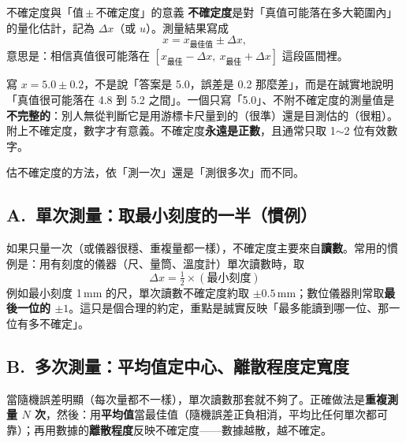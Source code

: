 \documentclass[11pt]{article}
\begin{document}
\begin{補充框}{不確定度與「值\,$\pm$\,不確定度」的意義}
\textbf{不確定度}是對「真值可能落在多大範圍內」的量化估計，記為 $\Delta x$（或 $u$）。測量結果寫成
$$x = x_{\text{最佳值}} \pm \Delta x,$$
意思是：相信真值很可能落在 $[x_{\text{最佳}}-\Delta x,\ x_{\text{最佳}}+\Delta x]$ 這段區間裡。

寫 $x = 5.0 \pm 0.2$，不是說「答案是 5.0，誤差是 0.2 那麼差」，而是在誠實地說明「真值很可能落在 4.8 到 5.2 之間」。一個只寫「5.0」、不附不確定度的測量值是\textbf{不完整的}：別人無從判斷它是用游標卡尺量到的（很準）還是目測估的（很粗）。附上不確定度，數字才有意義。不確定度\textbf{永遠是正數}，且通常只取 1$\sim$2 位有效數字。
\end{補充框}

估不確定度的方法，依「測一次」還是「測很多次」而不同。

\subsection*{\sffamily A.\ 單次測量：取最小刻度的一半（慣例）}

如果只量一次（或儀器很穩、重複量都一樣），不確定度主要來自\textbf{讀數}。常用的慣例是：用有刻度的儀器（尺、量筒、溫度計）單次讀數時，取
$$\boxed{\ \Delta x = \tfrac{1}{2}\times(\text{最小刻度})\ }$$
例如最小刻度 1\,mm 的尺，單次讀數不確定度約取 $\pm 0.5$\,mm；數位儀器則常取\textbf{最後一位的 $\pm 1$}。這只是個合理的約定，重點是誠實反映「最多能讀到哪一位、那一位有多不確定」。

\subsection*{\sffamily B.\ 多次測量：平均值定中心、離散程度定寬度}

當隨機誤差明顯（每次量都不一樣），單次讀數那套就不夠了。正確做法是\textbf{重複測量 $N$ 次}，然後：用\textbf{平均值}當最佳值（隨機誤差正負相消，平均比任何單次都可靠）；再用數據的\textbf{離散程度}反映不確定度——數據越散，越不確定。

\end{document}
